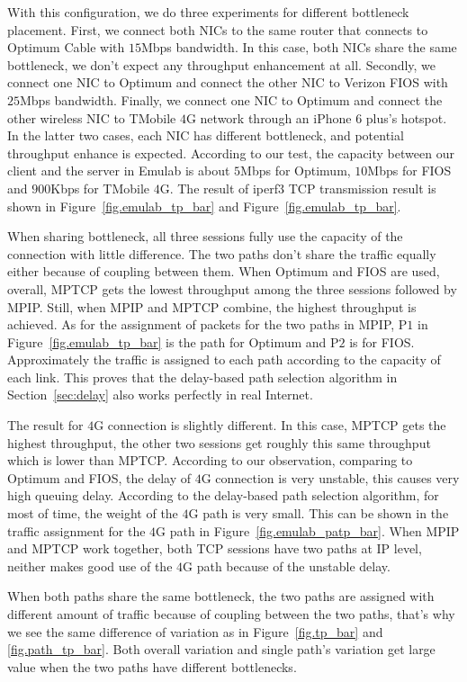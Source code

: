 With this configuration, we do three experiments for different bottleneck placement. First, we connect both NICs to the same router that connects to Optimum Cable with $15$Mbps bandwidth. In this case, both NICs share the same bottleneck, we don't expect any throughput enhancement at all. Secondly, we connect one NIC to Optimum and connect the other NIC to Verizon FIOS with $25$Mbps bandwidth. Finally, we connect one NIC to Optimum and connect the other wireless NIC to TMobile $4$G network through an iPhone 6 plus's hotspot. In the latter two cases, each NIC has different bottleneck, and potential throughput enhance is expected. According to our test, the capacity between our client and the server in Emulab is about $5$Mbps for Optimum, $10$Mbps for FIOS and $900$Kbps for TMobile $4$G. The result of iperf3 TCP transmission result is shown in Figure~\ref{fig.emulab_tp_bar} and Figure~\ref{fig.emulab_tp_bar}.

When sharing bottleneck, all three sessions fully use the capacity of the connection with little difference. The two paths don't share the traffic equally either because of coupling between them. When Optimum and FIOS are used, overall, MPTCP gets the lowest throughput among the three sessions followed by MPIP. Still, when MPIP and MPTCP combine, the highest throughput is achieved. As for the assignment of packets for the two paths in MPIP, P$1$ in Figure~\ref{fig.emulab_tp_bar} is the path for Optimum and P$2$ is for FIOS. Approximately the traffic is assigned to each path according to the capacity of each link. This proves that the delay-based path selection algorithm in Section~\ref{sec:delay} also works perfectly in real Internet.

The result for $4$G connection is slightly different. In this case, MPTCP gets the highest throughput, the other two sessions get roughly this same throughput which is lower than MPTCP. According to our observation, comparing to Optimum and FIOS, the delay of $4$G connection is very unstable, this causes very high queuing delay. According to the delay-based path selection algorithm, for most of time, the weight of the $4$G path is very small. This can be shown in the traffic assignment for the $4$G path in Figure~\ref{fig.emulab_patp_bar}. When MPIP and MPTCP work together, both TCP sessions have two paths at IP level, neither makes good use of the $4$G path because of the unstable delay.

When both paths share the same bottleneck, the two paths are assigned with different amount of traffic because of coupling between the two paths, that's why we see the same difference of variation as in Figure~\ref{fig.tp_bar} and \ref{fig.path_tp_bar}. Both overall variation and single path's variation get large value when the two paths have different bottlenecks.

